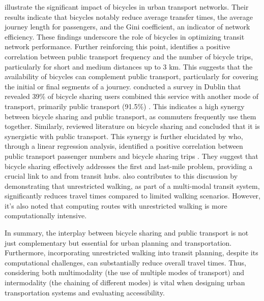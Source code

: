  illustrate the significant impact of bicycles in urban transport networks. 
Their results indicate that bicycles notably reduce average transfer times, the average journey length for passengers, and the Gini coefficient, an indicator of network efficiency. 
These findings underscore the role of bicycles in optimizing transit network performance.
Further reinforcing this point,  identifies a positive correlation between public transport frequency and the number of bicycle trips, particularly for short and medium distances up to 3 km. 
This suggests that the availability of bicycles can complement public transport, particularly for covering the initial or final segments of a journey.
 conducted a survey in Dublin that revealed 39\% of bicycle sharing users combined this service with another mode of transport, primarily public transport (91.5\%) . 
This indicates a high synergy between bicycle sharing and public transport, as commuters frequently use them together.
Similarly,  reviewed literature on bicycle sharing and concluded that it is synergistic with public transport.
This synergy is further elucidated by  who, through a linear regression analysis, identified a positive correlation between public transport passenger numbers and bicycle sharing trips . 
They suggest that bicycle sharing effectively addresses the first and last-mile problem, providing a crucial link to and from transit hubs.
 also contributes to this discussion by demonstrating that unrestricted walking, as part of a multi-modal transit system, significantly reduces travel times compared to limited walking scenarios.
However, it's also noted that computing routes with unrestricted walking is more computationally intensive.

In summary, the interplay between bicycle sharing and public transport is not just complementary but essential for urban planning and transportation.
Furthermore, incorporating unrestricted walking into transit planning, despite its computational challenges, can substantially reduce overall travel times.
Thus, considering both multimodality (the use of multiple modes of transport) and intermodality (the chaining of different modes) is vital when designing urban transportation systems and evaluating accessibility.
